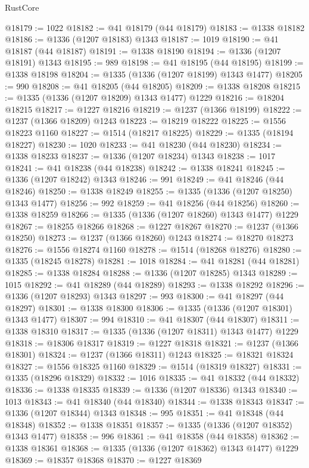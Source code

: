 \begin{lexlean}{RustCore}
\begin{coremodule}
@18179 := 1022
@18182 := @41 @18179 (@44 @18179)
@18183 := @1338 @18182
@18186 := @1336 (@1207 @18183) @1343
@18187 := 1019
@18190 := @41 @18187 (@44 @18187)
@18191 := @1338 @18190
@18194 := @1336 (@1207 @18191) @1343
@18195 := 989
@18198 := @41 @18195 (@44 @18195)
@18199 := @1338 @18198
@18204 := @1335 (@1336 (@1207 @18199) @1343 @1477)
@18205 := 990
@18208 := @41 @18205 (@44 @18205)
@18209 := @1338 @18208
@18215 := @1335 (@1336 (@1207 @18209) @1343 @1477) @1229
@18216 := @18204 @18215
@18217 := @1227 @18216
@18219 := @1237 (@1366 @18199)
@18222 := @1237 (@1366 @18209) @1243
@18223 := @18219 @18222
@18225 := @1556 @18223 @1160
@18227 := @1514 (@18217 @18225)
@18229 := @1335 (@18194 @18227)
@18230 := 1020
@18233 := @41 @18230 (@44 @18230)
@18234 := @1338 @18233
@18237 := @1336 (@1207 @18234) @1343
@18238 := 1017
@18241 := @41 @18238 (@44 @18238)
@18242 := @1338 @18241
@18245 := @1336 (@1207 @18242) @1343
@18246 := 991
@18249 := @41 @18246 (@44 @18246)
@18250 := @1338 @18249
@18255 := @1335 (@1336 (@1207 @18250) @1343 @1477)
@18256 := 992
@18259 := @41 @18256 (@44 @18256)
@18260 := @1338 @18259
@18266 := @1335 (@1336 (@1207 @18260) @1343 @1477) @1229
@18267 := @18255 @18266
@18268 := @1227 @18267
@18270 := @1237 (@1366 @18250)
@18273 := @1237 (@1366 @18260) @1243
@18274 := @18270 @18273
@18276 := @1556 @18274 @1160
@18278 := @1514 (@18268 @18276)
@18280 := @1335 (@18245 @18278)
@18281 := 1018
@18284 := @41 @18281 (@44 @18281)
@18285 := @1338 @18284
@18288 := @1336 (@1207 @18285) @1343
@18289 := 1015
@18292 := @41 @18289 (@44 @18289)
@18293 := @1338 @18292
@18296 := @1336 (@1207 @18293) @1343
@18297 := 993
@18300 := @41 @18297 (@44 @18297)
@18301 := @1338 @18300
@18306 := @1335 (@1336 (@1207 @18301) @1343 @1477)
@18307 := 994
@18310 := @41 @18307 (@44 @18307)
@18311 := @1338 @18310
@18317 := @1335 (@1336 (@1207 @18311) @1343 @1477) @1229
@18318 := @18306 @18317
@18319 := @1227 @18318
@18321 := @1237 (@1366 @18301)
@18324 := @1237 (@1366 @18311) @1243
@18325 := @18321 @18324
@18327 := @1556 @18325 @1160
@18329 := @1514 (@18319 @18327)
@18331 := @1335 (@18296 @18329)
@18332 := 1016
@18335 := @41 @18332 (@44 @18332)
@18336 := @1338 @18335
@18339 := @1336 (@1207 @18336) @1343
@18340 := 1013
@18343 := @41 @18340 (@44 @18340)
@18344 := @1338 @18343
@18347 := @1336 (@1207 @18344) @1343
@18348 := 995
@18351 := @41 @18348 (@44 @18348)
@18352 := @1338 @18351
@18357 := @1335 (@1336 (@1207 @18352) @1343 @1477)
@18358 := 996
@18361 := @41 @18358 (@44 @18358)
@18362 := @1338 @18361
@18368 := @1335 (@1336 (@1207 @18362) @1343 @1477) @1229
@18369 := @18357 @18368
@18370 := @1227 @18369

\end{coremodule}
\end{lexlean}
